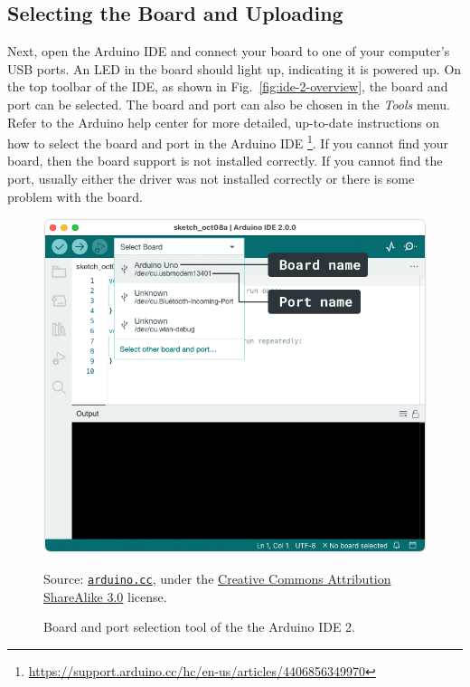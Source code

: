\subsection{Selecting the Board and Uploading}
Next, open the Arduino IDE and connect your board to one of your computer's USB ports.
An LED in the board should light up, indicating it is powered up.
On the top toolbar of the IDE, as shown in Fig.~\ref{fig:ide-2-overview}, the board and port can be selected.
The board and port can also be chosen in the \emph{Tools} menu.
Refer to the Arduino help center for more detailed, up-to-date instructions on how to select the board and port in the Arduino IDE%
\footnote{\url{https://support.arduino.cc/hc/en-us/articles/4406856349970}}.
If you cannot find your board, then the board support is not installed correctly.
If you cannot find the port, usually either the driver was not installed correctly or there is some problem with the board.

\begin{figure}[b]
  \centering
  \includegraphics[width=\textwidth]{img/board-selector-labels}%
  \\ \scriptsize
  \raggedright
  Source: \href{https://support.arduino.cc/hc/en-us/articles/4406856349970-Select-board-and-port-in-Arduino-IDE}{\texttt{arduino.cc}}, under the \href{https://creativecommons.org/licenses/by-sa/3.0/legalcode}{Creative Commons Attribution ShareAlike 3.0} license.
  \caption{Board and port selection tool of the the Arduino IDE 2.}
  \label{fig:board-selector-labels}
\end{figure}


